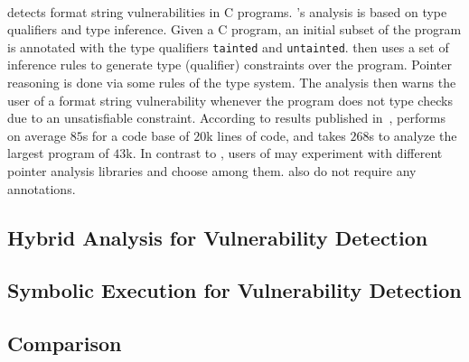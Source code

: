 \paragraph{\cqual}\cite{Shankar:2001:DFS} detects format string
vulnerabilities in C programs. \cqual's analysis is based on type
qualifiers\cite{Foster:1999:TTQ} and type inference. Given a C program,
an initial subset of the program is annotated with the type qualifiers
\texttt{tainted} and \texttt{untainted}. \cqual then uses a set of
inference rules to generate type (qualifier) constraints over the program.
Pointer reasoning is done via some rules of the type system.
The analysis then warns the user of a format string vulnerability
whenever the program does not type checks due to an unsatisfiable
constraint. According to results published in~\cite{Shankar:2001:DFS},
\cqual performs on average $85$s for a code base of $20$k lines of code,
and takes $268$s to analyze the largest program of $43$k.
In contrast to \cqual, users of \waint may experiment with different pointer
analysis libraries and choose among them. \waint also do not require
any annotations.


\subsection{Hybrid Analysis for Vulnerability Detection}
 \cite{Trip:2011:HAJSA}

\subsection{Symbolic Execution for Vulnerability Detection}

\subsection{Comparison}

